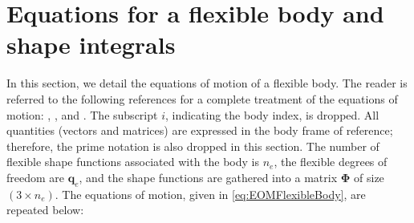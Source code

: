 \documentclass[wes, manuscript]{copernicus}
\renewcommand{\v}[1]{\boldsymbol{#1}}
\newcommand{\m}[1]{\boldsymbol{#1}}
\begin{document}
\appendix


\section{Equations for a flexible body and shape integrals}
\label{sec:FlexibleDefinitions}
In this section, we detail the equations of motion of a flexible body. 
The reader is referred to the following references for a complete treatment of the equations of motion: \cite{shabana:book}, \cite{Schwertassek:book}, and \cite{Wallrapp:1994}.
% 
% 
% 
The subscript $i$, indicating the body index, is dropped.
All quantities (vectors and matrices) are expressed in the body frame of reference; therefore, the prime notation is also dropped in this section.
The number of flexible shape functions associated with the body is $n_e$, the flexible degrees of freedom are $\v{q}_e$, and the shape functions are gathered into a matrix $\m{\Phi}$ of size $(3\times n_e)$. 
The equations of motion, given in \autoref{eq:EOMFlexibleBody}, are repeated below:
\end{document}
